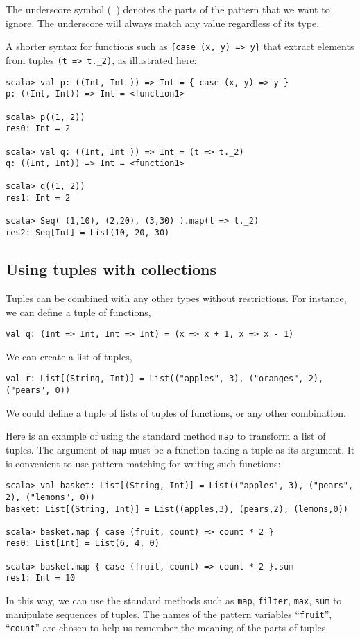 \noindent The underscore symbol (\lstinline!_!) denotes the parts
of the pattern that we want to ignore. The underscore will always
match any value regardless of its type.

A shorter syntax for functions such as \lstinline!{case (x, y) => y}!
that extract elements from tuples \lstinline!(t => t._2)!, as illustrated
here:
\begin{lstlisting}
scala> val p: ((Int, Int )) => Int = { case (x, y) => y }
p: ((Int, Int)) => Int = <function1>

scala> p((1, 2))
res0: Int = 2

scala> val q: ((Int, Int )) => Int = (t => t._2)
q: ((Int, Int)) => Int = <function1>

scala> q((1, 2))
res1: Int = 2

scala> Seq( (1,10), (2,20), (3,30) ).map(t => t._2)
res2: Seq[Int] = List(10, 20, 30)
\end{lstlisting}


\subsection{Using tuples with collections}

Tuples can be combined with any other types without restrictions.
For instance, we can define a tuple of functions,
\begin{lstlisting}
val q: (Int => Int, Int => Int) = (x => x + 1, x => x - 1)
\end{lstlisting}
We can create a list of tuples,
\begin{lstlisting}
val r: List[(String, Int)] = List(("apples", 3), ("oranges", 2), ("pears", 0))
\end{lstlisting}
We could define a tuple of lists of tuples of functions, or any other
combination.

Here is an example of using the standard method \lstinline!map! to
transform a list of tuples. The argument of \lstinline!map! must
be a function taking a tuple as its argument. It is convenient to
use pattern matching for writing such functions:
\begin{lstlisting}
scala> val basket: List[(String, Int)] = List(("apples", 3), ("pears", 2), ("lemons", 0))
basket: List[(String, Int)] = List((apples,3), (pears,2), (lemons,0))

scala> basket.map { case (fruit, count) => count * 2 }
res0: List[Int] = List(6, 4, 0)

scala> basket.map { case (fruit, count) => count * 2 }.sum
res1: Int = 10
\end{lstlisting}
In this way, we can use the standard methods such as \lstinline!map!,
\lstinline!filter!, \lstinline!max!, \lstinline!sum! to manipulate
sequences of tuples. The names of the pattern variables \textsf{``}\lstinline!fruit!\textsf{''},
\textsf{``}\lstinline!count!\textsf{''} are chosen to help us remember the meaning
of the parts of tuples.

